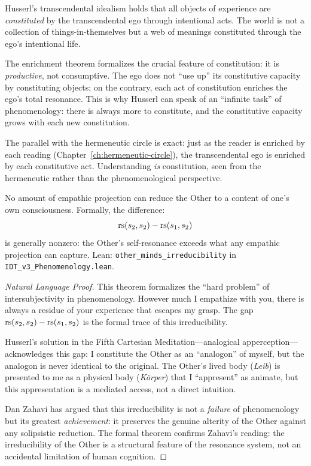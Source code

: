 \begin{interpretation}
\label{interp:transcendental-idealism}
Husserl's transcendental idealism holds that all objects of experience are
\emph{constituted} by the transcendental ego through intentional acts.
The world is not a collection of things-in-themselves but a web of meanings
constituted through the ego's intentional life.

The enrichment theorem formalizes the crucial feature of constitution:
it is \emph{productive}, not consumptive.  The ego does not ``use up''
its constitutive capacity by constituting objects; on the contrary, each
act of constitution enriches the ego's total resonance.  This is why
Husserl can speak of an ``infinite task'' of phenomenology: there is
always more to constitute, and the constitutive capacity grows with each
new constitution.

The parallel with the hermeneutic circle is exact: just as the reader is
enriched by each reading (Chapter~\ref{ch:hermeneutic-circle}), the
transcendental ego is enriched by each constitutive act.  Understanding
\emph{is} constitution, seen from the hermeneutic rather than the
phenomenological perspective.
\end{interpretation}

\begin{theorem}
\label{thm:other-minds}
No amount of empathic projection can reduce the Other to a content of
one's own consciousness.  Formally, the difference:
\[
\mathrm{rs}(s_2, s_2) - \mathrm{rs}(s_1, s_2)
\]
is generally nonzero: the Other's self-resonance exceeds what any empathic
projection can capture.
Lean: \texttt{other\_minds\_irreducibility} in \texttt{IDT\_v3\_Phenomenology.lean}.
\end{theorem}

\begin{proof}[Natural Language Proof]
This theorem formalizes the ``hard problem'' of intersubjectivity in
phenomenology.  However much I empathize with you, there is always a
residue of your experience that escapes my grasp.  The gap
$\mathrm{rs}(s_2, s_2) - \mathrm{rs}(s_1, s_2)$ is the formal trace of this
irreducibility.

Husserl's solution in the Fifth Cartesian Meditation---analogical
apperception---acknowledges this gap: I constitute the Other as an
``analogon'' of myself, but the analogon is never identical to the
original.  The Other's lived body (\textit{Leib}) is presented to me
as a physical body (\textit{K\"orper}) that I ``appresent'' as animate,
but this appresentation is a mediated access, not a direct intuition.

Dan Zahavi has argued that this irreducibility is not a \emph{failure}
of phenomenology but its greatest \emph{achievement}: it preserves the
genuine alterity of the Other against any solipsistic reduction.  The
formal theorem confirms Zahavi's reading: the irreducibility of the
Other is a structural feature of the resonance system, not an
accidental limitation of human cognition.
\end{proof}

